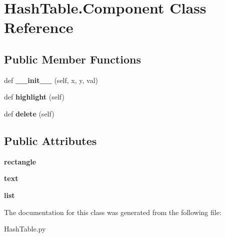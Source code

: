 \hypertarget{class_hash_table_1_1_component}{}\section{Hash\+Table.\+Component Class Reference}
\label{class_hash_table_1_1_component}
\subsection*{Public Member Functions}
\begin{DoxyCompactItemize}
\item 
\mbox{\label{class_hash_table_1_1_component_ad467b4ea0187c36b98a463258c18a30e}} 
def {\bfseries \+\_\+\+\_\+init\+\_\+\+\_\+} (self, x, y, val)
\item 
\mbox{\label{class_hash_table_1_1_component_acf540b5e455c6eb2a6db6b5b4f237114}} 
def {\bfseries highlight} (self)
\item 
\mbox{\label{class_hash_table_1_1_component_ac4fdbb45fac4e992e647130feaab6415}} 
def {\bfseries delete} (self)
\end{DoxyCompactItemize}
\subsection*{Public Attributes}
\begin{DoxyCompactItemize}
\item 
\mbox{\label{class_hash_table_1_1_component_abe583ebc5c985cec2447736838e49905}} 
{\bfseries rectangle}
\item 
\mbox{\label{class_hash_table_1_1_component_a4633f152c7288e770f0c6b6134a734e3}} 
{\bfseries text}
\item 
\mbox{\label{class_hash_table_1_1_component_a273d2ccaf2699a3ff15332954201a25a}} 
{\bfseries list}
\end{DoxyCompactItemize}


The documentation for this class was generated from the following file\+:\begin{DoxyCompactItemize}
\item 
Hash\+Table.\+py\end{DoxyCompactItemize}
